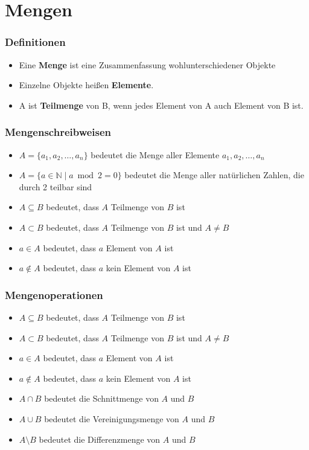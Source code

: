 \section{Mengen}
\begin{frame}
    \frametitle{Definitionen}
    \begin{itemize}
        \vfill \item Eine \textbf{Menge} ist eine Zusammenfassung wohlunterschiedener Objekte
        \vfill \item Einzelne Objekte heißen \textbf{Elemente}.
        \vfill \item A ist \textbf{Teilmenge} von B, wenn jedes Element von A auch Element von B ist.
    \end{itemize}
\end{frame}

\begin{frame}
    \frametitle{Mengenschreibweisen}
    \begin{itemize}
        \vfill \item $A = \{a_1, a_2, \dots, a_n\} $ bedeutet die Menge aller Elemente $a_1, a_2, \dots, a_n$
        \vfill \item $A = \{a \in \mathbb{N} \mid a \bmod 2 = 0\}$ bedeutet die Menge aller natürlichen Zahlen, die durch 2 teilbar sind
        \vfill \item $ A \subseteq B $ bedeutet, dass $ A $ Teilmenge von $ B $ ist
        \vfill \item $ A \subset B $ bedeutet, dass $ A $ Teilmenge von $ B $ ist und $ A \neq B $
        \vfill \item $a \in A$ bedeutet, dass $a$ Element von $A$ ist
        \vfill \item $a \notin A$ bedeutet, dass $a$ kein Element von $A$ ist
    \end{itemize}
\end{frame}

\begin{frame}
    \frametitle{Mengenoperationen}
    \begin{itemize}
        \vfill \item $ A \subseteq B $ bedeutet, dass $ A $ Teilmenge von $ B $ ist
        \vfill \item $ A \subset B $ bedeutet, dass $ A $ Teilmenge von $ B $ ist und $ A \neq B $
        \vfill \item $a \in A$ bedeutet, dass $a$ Element von $A$ ist
        \vfill \item $a \notin A$ bedeutet, dass $a$ kein Element von $A$ ist
        \vfill \item $A \cap B$ bedeutet die Schnittmenge von $A$ und $B$
        \vfill \item $A \cup B$ bedeutet die Vereinigungsmenge von $A$ und $B$
        \vfill \item $A \setminus B$ bedeutet die Differenzmenge von $A$ und $B$
    \end{itemize}
\end{frame}

